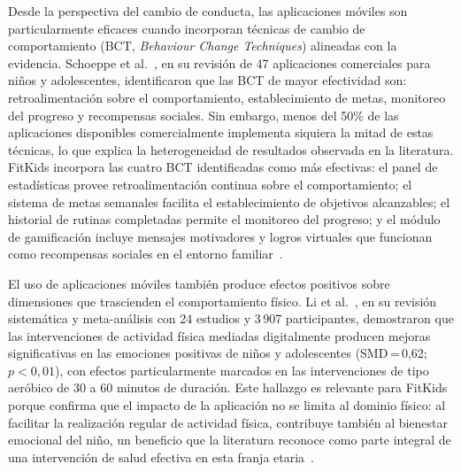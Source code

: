 					Desde la perspectiva del cambio de conducta, las aplicaciones móviles son particularmente eficaces cuando incorporan técnicas de cambio de comportamiento (BCT, \textit{Behaviour Change Techniques}) alineadas con la evidencia. Schoeppe et al.~\cite{Schoeppe2017}, en su revisión de 47 aplicaciones comerciales para niños y adolescentes, identificaron que las BCT de mayor efectividad son: retroalimentación sobre el comportamiento, establecimiento de metas, monitoreo del progreso y recompensas sociales. Sin embargo, menos del 50\% de las aplicaciones disponibles comercialmente implementa siquiera la mitad de estas técnicas, lo que explica la heterogeneidad de resultados observada en la literatura. FitKids incorpora las cuatro BCT identificadas como más efectivas: el panel de estadísticas provee retroalimentación continua sobre el comportamiento; el sistema de metas semanales facilita el establecimiento de objetivos alcanzables; el historial de rutinas completadas permite el monitoreo del progreso; y el módulo de gamificación incluye mensajes motivadores y logros virtuales que funcionan como recompensas sociales en el entorno familiar~\cite{Schoeppe2017,WangGamif2025}.
					
					El uso de aplicaciones móviles también produce efectos positivos sobre dimensiones que trascienden el comportamiento físico. Li et al.~\cite{Li2022}, en su revisión sistemática y meta-análisis con 24 estudios y 3\,907 participantes, demostraron que las intervenciones de actividad física mediadas digitalmente producen mejoras significativas en las emociones positivas de niños y adolescentes (SMD\,=\,0,62; $p < 0{,}01$), con efectos particularmente marcados en las intervenciones de tipo aeróbico de 30 a 60 minutos de duración. Este hallazgo es relevante para FitKids porque confirma que el impacto de la aplicación no se limita al dominio físico: al facilitar la realización regular de actividad física, contribuye también al bienestar emocional del niño, un beneficio que la literatura reconoce como parte integral de una intervención de salud efectiva en esta franja etaria~\cite{Li2022,Wilhite2023}.

